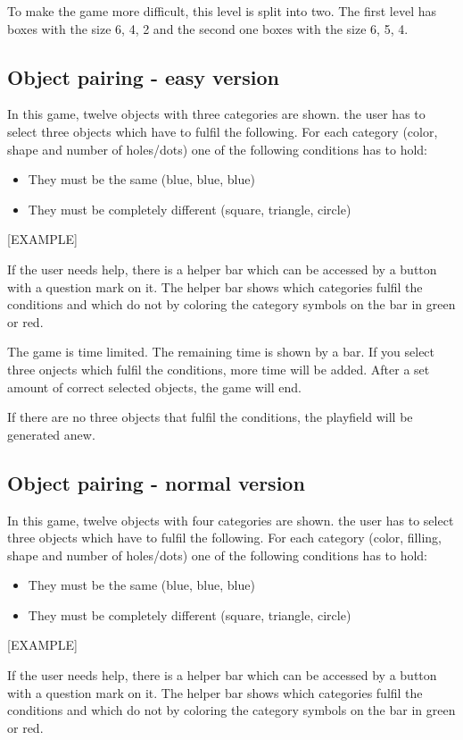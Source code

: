 To make the game more difficult, this level is split into two.
The first level has boxes with the size 6, 4, 2 and the second one boxes with the size 6, 5, 4.

\subsection{Object pairing - easy version}\label{subsec:object-pairing---easy-version}
In this game, twelve objects with three categories are shown.
the user has to select three objects which have to fulfil the following.
For each category (color, shape and number of holes/dots) one of the following conditions has to hold:
\begin{itemize}
    \item They must be the same (blue, blue, blue)
    \item They must be completely different (square, triangle, circle)
\end{itemize}
[EXAMPLE]

If the user needs help, there is a helper bar which can be accessed by a button with a question mark on it.
The helper bar shows which categories fulfil the conditions and which do not
by coloring the category symbols on the bar in green or red.

The game is time limited. The remaining time is shown by a bar.
If you select three onjects which fulfil the conditions, more time will be added.
After a set amount of correct selected objects, the game will end.

If there are no three objects that fulfil the conditions, the playfield will be generated anew.

\subsection{Object pairing - normal version}\label{subsec:object-pairing---normal-version}
In this game, twelve objects with four categories are shown.
the user has to select three objects which have to fulfil the following.
For each category (color, filling, shape and number of holes/dots) one of the following conditions has to hold:
\begin{itemize}
    \item They must be the same (blue, blue, blue)
    \item They must be completely different (square, triangle, circle)
\end{itemize}
[EXAMPLE]

If the user needs help, there is a helper bar which can be accessed by a button with a question mark on it.
The helper bar shows which categories fulfil the conditions and which do not
by coloring the category symbols on the bar in green or red.

